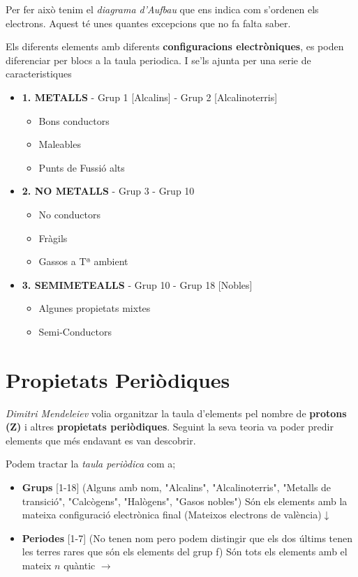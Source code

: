 \documentclass[12pt]{article}
\begin{document}
Per fer això tenim el \textit{diagrama d'Aufbau} que ens indica com s'ordenen els electrons. Aquest té unes quantes excepcions que no fa falta saber.

Els diferents elements amb diferents \textbf{configuracions electròniques}, es poden diferenciar per blocs a la taula periodica. I se'ls ajunta per una serie de caracteristiques

\begin{itemize}
    \item \textbf{1. METALLS} - Grup 1 [Alcalins] - Grup 2 [Alcalinoterris]
    \begin{itemize}
        \item Bons conductors
        \item Maleables
        \item Punts de Fussió alts
    \end{itemize}
    \item \textbf{2. NO METALLS} - Grup 3 - Grup 10
     \begin{itemize}
        \item No conductors
        \item Fràgils
        \item Gassos a Tª ambient
    \end{itemize}
    \item \textbf{3. SEMIMETEALLS} - Grup 10 - Grup 18 [Nobles]
     \begin{itemize}
        \item Algunes propietats mixtes
        \item Semi-Conductors
    \end{itemize}
\end{itemize}

\section{Propietats Periòdiques}

\textit{Dimitri Mendeleiev} volia organitzar la taula d'elements pel nombre de \textbf{protons (Z)} i altres \textbf{propietats periòdiques}. Seguint la seva teoria va poder predir elements que més endavant es van descobrir.

Podem tractar la \textit{taula periòdica} com a;

\begin{itemize}
    \item \textbf{Grups} [1-18] (Alguns amb nom, "Alcalins", "Alcalinoterris", "Metalls de transició", "Calcògens", "Halògens", "Gasos nobles") Són els elements amb la mateixa configuració electrònica final (Mateixos electrons de valència)$\downarrow$
    \item \textbf{Periodes} [1-7] (No tenen nom pero podem distingir que els dos últims tenen les terres rares que són els elements del grup f) Són tots els elements amb el mateix $n$ quàntic $\rightarrow$
\end{itemize}
\end{document}
